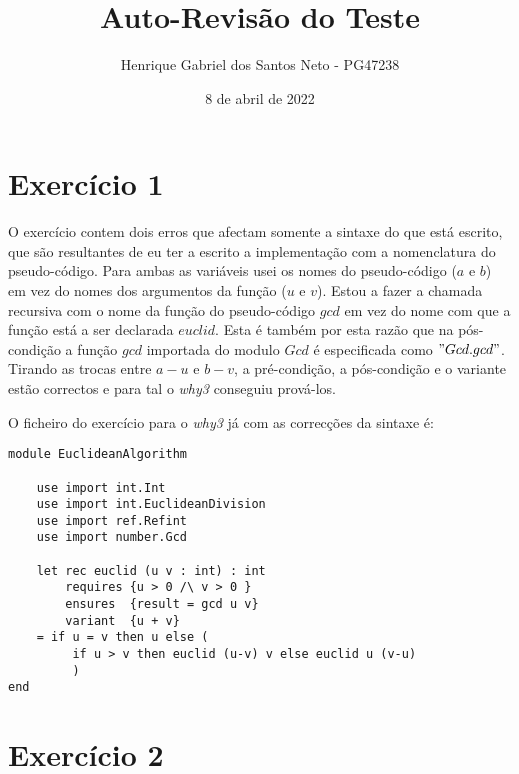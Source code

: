 \documentclass[12pt]{article}
\title{\vspace{-4em} Auto-Revisão do Teste}
\author{ Henrique Gabriel dos Santos Neto - PG47238 }
\date{8 de abril de 2022}
\begin{document}
\maketitle

\section*{Exercício 1}

O exercício contem dois erros que afectam somente a sintaxe do que está escrito, que são resultantes de eu ter a escrito a implementação com a nomenclatura do pseudo-código. Para ambas as variáveis usei os nomes do pseudo-código ($a$ e $b$) em vez do nomes dos argumentos da função ($u$ e $v$). Estou a fazer a chamada recursiva com o nome da função do pseudo-código $gcd$ em vez do nome com que a função está a ser declarada $euclid$. Esta é também por esta razão que na pós-condição a função $gcd$ importada do modulo $Gcd$ é especificada como $"Gcd.gcd"$. Tirando as trocas entre $a-u$ e $b-v$, a pré-condição, a pós-condição e o variante estão correctos e para tal o \textit{why3} conseguiu prová-los.

O ficheiro do exercício para o \textit{why3} já com as correcções da sintaxe é:

\begin{verbatim}
module EuclideanAlgorithm

    use import int.Int
    use import int.EuclideanDivision
    use import ref.Refint
    use import number.Gcd

    let rec euclid (u v : int) : int
        requires {u > 0 /\ v > 0 } 
        ensures  {result = gcd u v}
        variant  {u + v}
    = if u = v then u else (
         if u > v then euclid (u-v) v else euclid u (v-u)
         )
end
\end{verbatim}


\section*{Exercício 2}
\end{document}
